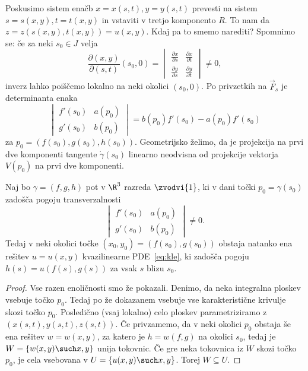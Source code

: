 Poskusimo sistem enačb $x = x(s, t), y = y(s, t)$ prevesti na sistem $s = s(x,
y), t = t(x, y)$ in vstaviti v tretjo komponento $R$.
To nam da $z = z(s(x, y), t(x, y)) = u(x, y)$.
Kdaj pa to smemo narediti?
Spomnimo se: če za neki $s_0 \in J$ velja
\[
  \frac{\partial (x, y)}{\partial (s, t)}(s_0, 0)
  =
  \begin{vmatrix}
	\frac{\partial x}{\partial s} & \frac{\partial x}{\partial t} \\
	\frac{\partial y}{\partial s} & \frac{\partial y}{\partial t}
  \end{vmatrix}
  \ne 0,
\]
inverz lahko poiščemo lokalno na neki okolici $(s_0, 0)$.
Po privzetkih na $\vec{F}_s$ je determinanta enaka
\[
  \begin{vmatrix}
	f'(s_0) & a(p_0) \\
	g'(s_0) & b(p_0)
  \end{vmatrix}
  =
  b(p_0) f'(s_0) - a(p_0) f'(s_0)
\]
za $p_0 = (f(s_0), g(s_0), h(s_0))$.
Geometrijsko želimo, da je projekcija na prvi dve komponenti tangente
$\dot{\gamma}(s_0)$ linearno neodvisna od projekcije vektorja $V(p_0)$ na prvi
dve komponenti.

\begin{trditev}
  Naj bo $\gamma = (f, g, h)$ pot v $\R^3$ razreda $\zvodvi{1}$, ki v dani točki
  $p_0 = \gamma(s_0)$ zadošča pogoju transverzalnosti
  \[
	\begin{vmatrix}
	  f'(s_0) & a(p_0) \\
	  g'(s_0) & b(p_0)
	\end{vmatrix}
	\ne 0.
  \]
  Tedaj v neki okolici točke $(x_0, y_0) = (f(s_0), g(s_0))$ obstaja natanko ena
  rešitev $u = u(x, y)$ kvazilinearne PDE~\eqref{eq:kle}, ki zadošča pogoju
  $h(s) = u(f(s), g(s))$ za vsak $s$ blizu $s_0$.
\end{trditev}

\begin{proof}
  Vse razen enoličnosti smo že pokazali.
  Denimo, da neka integralna ploskev vsebuje točko $p_0$.
  Tedaj po že dokazanem vsebuje vse karakteristične krivulje skozi točko $p_0$.
  Posledično (vsaj lokalno) celo ploskev parametriziramo z $(x(s, t), y(s, t),
  z(s, t))$.
  Če privzamemo, da v neki okolici $p_0$ obstaja še ena rešitev $w = w(x, y)$,
  za katero je $h = w(f, g)$ na okolici $s_0$, tedaj je $W = \{w(x, y) \such x,
  y\}$ unija tokovnic.
  Če gre neka tokovnica iz $W$ skozi točko $p_0$, je cela vsebovana v $U =
  \{u(x,y) \such x, y\}$.
  Torej $W \subseteq U$.
\end{proof}

